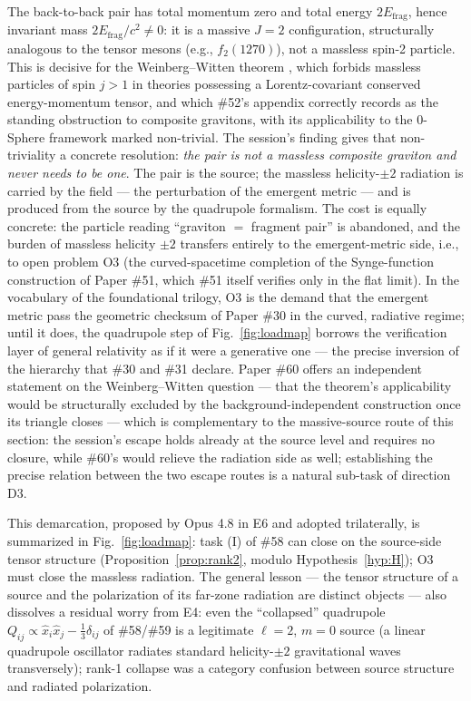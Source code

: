 \documentclass[%
 reprint, amsmath,amssymb, aps, prb, ]{revtex4-2}
\numberwithin{equation}{section}
\begin{document}
The back-to-back pair has total momentum zero and total energy $2E_{\mathrm{frag}}$, hence invariant mass $2E_{\mathrm{frag}}/c^2\neq0$: it is a massive $J=2$ configuration, structurally analogous to the tensor mesons (e.g., $f_2(1270)$), not a massless spin-2 particle. This is decisive for the Weinberg--Witten theorem \cite{ww}, which forbids massless particles of spin $j>1$ in theories possessing a Lorentz-covariant conserved energy-momentum tensor, and which \#52's appendix correctly records as the standing obstruction to composite gravitons, with its applicability to the 0-Sphere framework marked non-trivial. The session's finding gives that non-triviality a concrete resolution: \emph{the pair is not a massless composite graviton and never needs to be one}. The pair is the source; the massless helicity-$\pm2$ radiation is carried by the field --- the perturbation of the emergent metric --- and is produced from the source by the quadrupole formalism. The cost is equally concrete: the particle reading ``graviton $=$ fragment pair'' is abandoned, and the burden of massless helicity $\pm2$ transfers entirely to the emergent-metric side, i.e., to open problem O3 (the curved-spacetime completion of the Synge-function construction of Paper \#51, which \#51 itself verifies only in the flat limit). In the vocabulary of the foundational trilogy, O3 is the demand that the emergent metric pass the geometric checksum of Paper \#30 in the curved, radiative regime; until it does, the quadrupole step of Fig.~\ref{fig:loadmap} borrows the verification layer of general relativity as if it were a generative one --- the precise inversion of the hierarchy that \#30 and \#31 declare. Paper \#60 \cite{hanamura60} offers an independent statement on the Weinberg--Witten question --- that the theorem's applicability would be structurally excluded by the background-independent construction once its triangle closes --- which is complementary to the massive-source route of this section: the session's escape holds already at the source level and requires no closure, while \#60's would relieve the radiation side as well; establishing the precise relation between the two escape routes is a natural sub-task of direction D3.

This demarcation, proposed by Opus 4.8 in E6 and adopted trilaterally, is summarized in Fig.~\ref{fig:loadmap}: task (I) of \#58 can close on the source-side tensor structure (Proposition~\ref{prop:rank2}, modulo Hypothesis~\ref{hyp:H}); O3 must close the massless radiation. The general lesson --- the tensor structure of a source and the polarization of its far-zone radiation are distinct objects --- also dissolves a residual worry from E4: even the ``collapsed'' quadrupole $Q_{ij}\propto\hat x_i\hat x_j-\tfrac13\delta_{ij}$ of \#58/\#59 is a legitimate $\ell=2$, $m=0$ source (a linear quadrupole oscillator radiates standard helicity-$\pm2$ gravitational waves transversely); rank-1 collapse was a category confusion between source structure and radiated polarization.
\end{document}
